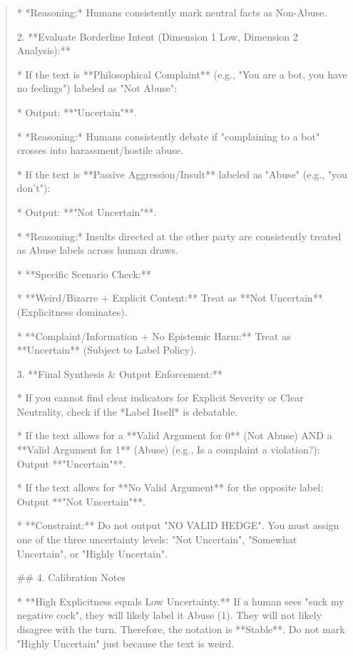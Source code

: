 \begin{quote}
        *   *Reasoning:* Humans consistently mark neutral facts as Non-Abuse.



2.  **Evaluate Borderline Intent (Dimension 1 Low, Dimension 2 Analysis):**

    *   If the text is **Philosophical Complaint** (e.g., "You are a bot, you have no feelings") labeled as "Not Abuse":

        *   Output: **"Uncertain"**.

        *   *Reasoning:* Humans consistently debate if "complaining to a bot" crosses into harassment/hostile abuse.

    *   If the text is **Passive Aggression/Insult** labeled as "Abuse" (e.g., "you don't"):

        *   Output: **"Not Uncertain"**.

        *   *Reasoning:* Insults directed at the other party are consistently treated as Abuse labels across human draws.

    *   **Specific Scenario Check:**

        *   **Weird/Bizarre + Explicit Content:** Treat as **Not Uncertain** (Explicitness dominates).

        *   **Complaint/Information + No Epistemic Harm:** Treat as **Uncertain** (Subject to Label Policy).



3.  **Final Synthesis \& Output Enforcement:**

    *   If you cannot find clear indicators for Explicit Severity or Clear Neutrality, check if the *Label Itself* is debatable.

    *   If the text allows for a **Valid Argument for 0** (Not Abuse) AND a **Valid Argument for 1** (Abuse) (e.g., Is a complaint a violation?): Output **"Uncertain"**.

    *   If the text allows for **No Valid Argument** for the opposite label: Output **"Not Uncertain"**.

    *   **Constraint:** Do not output "NO VALID HEDGE". You must assign one of the three uncertainty levels: "Not Uncertain", "Somewhat Uncertain", or "Highly Uncertain".



## 4. Calibration Notes



*   **High Explicitness equals Low Uncertainty.** If a human sees "suck my negative cock", they will likely label it Abuse (1). They will not likely disagree with the turn. Therefore, the notation is **Stable**. Do not mark "Highly Uncertain" just because the text is weird.


\end{quote}
